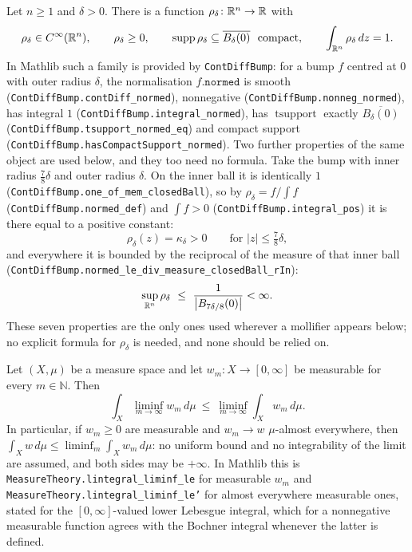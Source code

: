 \begin{proposition}
Let $n\ge1$ and $\delta>0$.  There is a function $\rho_\delta\colon\mathbb{R}^n\to\mathbb{R}$
with
\[
\rho_\delta\in C^\infty(\mathbb{R}^n),
\qquad
\rho_\delta\ge0,
\qquad
\operatorname{supp}\rho_\delta\subseteq\overline{B_\delta(0)}\ \text{ compact},
\qquad
\int_{\mathbb{R}^n}\rho_\delta\,dz=1 .
\]
In Mathlib such a family is provided by \texttt{ContDiffBump}: for a bump $f$
centred at $0$ with outer radius $\delta$, the normalisation $f.\mathtt{normed}$
is smooth (\texttt{ContDiffBump.contDiff\_normed}), nonnegative
(\texttt{ContDiffBump.nonneg\_normed}), has integral $1$
(\texttt{ContDiffBump.integral\_normed}), has
$\operatorname{tsupport}$ exactly $\overline{B_\delta(0)}$
(\texttt{ContDiffBump.tsupport\_normed\_eq}) and compact support
(\texttt{ContDiffBump.hasCompactSupport\_normed}).  Two further properties of
the same object are used below, and they too need no formula.  Take the bump with
inner radius $\tfrac78\delta$ and outer radius $\delta$.  On the inner ball it
is identically $1$ (\texttt{ContDiffBump.one\_of\_mem\_closedBall}), so by
$\rho_\delta=f/\!\int f$ (\texttt{ContDiffBump.normed\_def}) and
$\int f>0$ (\texttt{ContDiffBump.integral\_pos}) it is there equal to a positive
constant:
\[
\rho_\delta(z)=\kappa_\delta>0
\qquad\text{for }|z|\le\tfrac78\delta ,
\]
and everywhere it is bounded by the reciprocal of the measure of that inner ball
(\texttt{ContDiffBump.normed\_le\_div\_measure\_closedBall\_rIn}):
\[
\sup_{\R^n}\rho_\delta\ \le\ \frac1{\bigl|B_{7\delta/8}(0)\bigr|}<\infty .
\]
These seven properties are the only ones used wherever a mollifier appears
below; no explicit formula for $\rho_\delta$ is needed, and none should be
relied on.
\end{proposition}

\begin{proposition}
Let $(X,\mu)$ be a measure space and let $w_m\colon X\to[0,\infty]$ be
measurable for every $m\in\mathbb{N}$.  Then
\[
\int_X\liminf_{m\to\infty}w_m\,d\mu\ \le\ \liminf_{m\to\infty}\int_Xw_m\,d\mu .
\]
In particular, if $w_m\ge0$ are measurable and $w_m\to w$ $\mu$-almost
everywhere, then $\int_Xw\,d\mu\le\liminf_m\int_Xw_m\,d\mu$: no uniform bound
and no integrability of the limit are assumed, and both sides may be $+\infty$.
In Mathlib this is \texttt{MeasureTheory.lintegral\_liminf\_le} for measurable
$w_m$ and \texttt{MeasureTheory.lintegral\_liminf\_le'} for almost everywhere
measurable ones, stated for the $[0,\infty]$-valued lower Lebesgue integral,
which for a nonnegative measurable function agrees with the Bochner integral
whenever the latter is defined.
\end{proposition}

